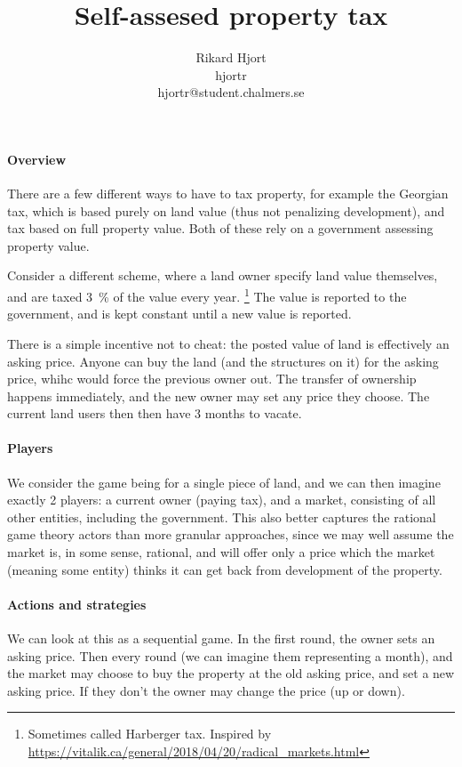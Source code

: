 \documentclass{article}
\title{Self-assesed property tax}
\author{Rikard Hjort\\
  hjortr\\
hjortr@student.chalmers.se}
\begin{document}
\maketitle

\paragraph{Overview}
There are a few different ways to have to tax property, for example the Georgian tax, which
is based purely on land value (thus not penalizing development), and tax based
on full property value. Both of these rely on a government assessing property value.

Consider a different scheme, where a land owner specify land value themselves,
and are taxed 3~\% of the value every year.
  \footnote{Sometimes called Harberger tax. Inspired by \url{https://vitalik.ca/general/2018/04/20/radical_markets.html}}
 The value is reported to the government, and is kept constant until a new value is reported.

There is a simple incentive not to cheat: the posted value of land is
effectively an asking price. Anyone can buy the land (and the structures on it)
for the asking price, whihc would force the previous owner out. The transfer of
ownership happens immediately, and the new owner may set any price they choose.
The current land users then then have 3 months to vacate.

\paragraph{Players}
We consider the game being for a single piece of land, and we can then imagine
exactly 2 players: a current owner (paying tax), and a market, consisting of all
other entities, including the government. This also better captures the rational
game theory actors than more granular approaches, since we may well assume the
market is, in some sense, rational, and will offer only a price which the market
(meaning some entity) thinks it can get back from development of the property.

\paragraph{Actions and strategies}
We can look at this as a sequential game. In the first round, the owner sets an
asking price. Then every round (we can imagine them representing a month), and
the market may choose to buy the property at the old asking price, and set a new
asking price. If they don't the owner may change the price (up or down).
\end{document}
